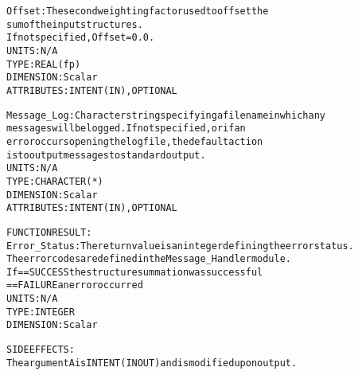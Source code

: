 \begin{alltt}
        Offset:        The second weighting factor used to offset the
                       sum of the input structures.
                       If not specified, Offset = 0.0.
                       UNITS:      N/A
                       TYPE:       REAL(fp)
                       DIMENSION:  Scalar
                       ATTRIBUTES: INTENT(IN), OPTIONAL
 
        Message_Log:   Character string specifying a filename in which any
                       messages will be logged. If not specified, or if an
                       error occurs opening the log file, the default action
                       is to output messages to standard output.
                       UNITS:      N/A
                       TYPE:       CHARACTER(*)
                       DIMENSION:  Scalar
                       ATTRIBUTES: INTENT(IN), OPTIONAL
 
  FUNCTION RESULT:
        Error_Status:  The return value is an integer defining the error status.
                       The error codes are defined in the Message_Handler module.
                       If == SUCCESS the structure summation was successful
                          == FAILURE an error occurred
                       UNITS:      N/A
                       TYPE:       INTEGER
                       DIMENSION:  Scalar
 
  SIDE EFFECTS:
        The argument A is INTENT(IN OUT) and is modified upon output.
 
  \end{alltt}
